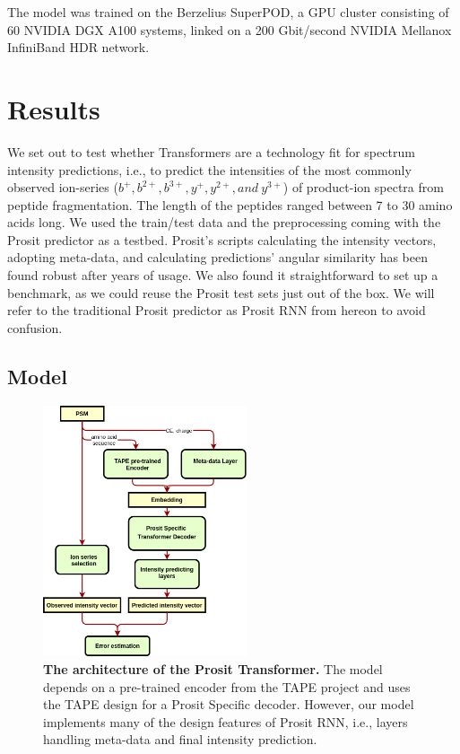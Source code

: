 \documentclass[10pt,a4paper]{article}
\begin{document}
The model was trained on the Berzelius SuperPOD, a GPU cluster consisting of 60 NVIDIA DGX A100 systems, linked on a 200 Gbit/second NVIDIA Mellanox InfiniBand HDR network.

\section*{Results}
We set out to test whether Transformers are a technology fit for spectrum intensity predictions, i.e., to predict the intensities of the most commonly observed ion-series ($b^+, b^{2+}, b^{3+}, y^{+}, y^{2+}, and\ y^{3+}$) of product-ion spectra from peptide fragmentation. The length of the peptides ranged between 7 to 30  amino acids long. We used the train/test data and the preprocessing coming with the Prosit predictor as a testbed. Prosit’s scripts calculating the intensity vectors, adopting meta-data, and calculating predictions’ angular similarity has been found robust after years of usage. We also found it straightforward to set up a benchmark, as we could reuse the Prosit test sets just out of the box. We will refer to the traditional Prosit predictor as Prosit RNN from hereon to avoid confusion.

\subsection*{Model}

\begin{figure}[htb!]
    \centering
    \includegraphics[width=6cm]{./img/architecture.png}
    \caption{{\bf The architecture of the Prosit Transformer.} The model depends on a pre-trained encoder from the TAPE project and uses the TAPE design for a Prosit Specific decoder. However, our model implements many of the design features of Prosit RNN, i.e., layers handling meta-data and final intensity prediction. \label{fig:architecture}}
\end{figure}
    
\end{document}
